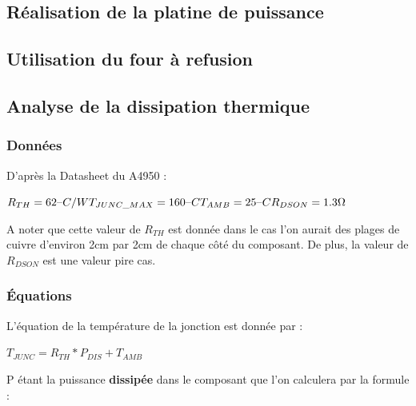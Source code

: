\documentclass[11pt, french]{article} %
\begin{document}
\subsection{Réalisation de la platine de puissance}

\subsection{Utilisation du four à refusion}

\subsection{Analyse de la dissipation thermique}



\subsubsection{Données}

\noindent
D'après la Datasheet du A4950 :

\vspace{0.5cm}

\noindent
$ 
R_{TH} = 62 \char123C/W  \\
T_{JUNC\_MAX} = 160 \char123C  \\
T_{AMB} = 25\char123C  \\
R_{DSON} = 1.3 \Omega  \\
$



\noindent
A noter que cette valeur de $R_{TH}$ est donnée dans le cas l'on aurait des plages de cuivre d'environ 2cm par 2cm de chaque côté du composant. De plus, la valeur de $R_{DSON}$ est une valeur pire cas.

\subsubsection{Équations}

\noindent
L'équation de la température de la jonction est donnée par :

\vspace{0.5cm}

\noindent
$
T_{JUNC} = R_{TH} * P_{DIS} + T_{AMB}
$

\vspace{0.5cm}

\noindent
P étant la puissance \textbf{dissipée} dans le composant que l'on calculera par la formule :

\vspace{0.5cm}
\end{document}
